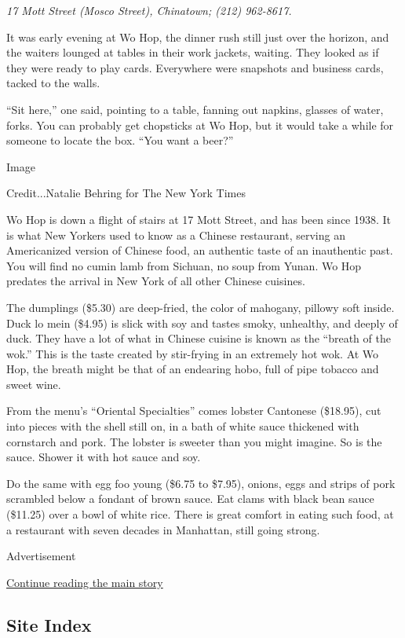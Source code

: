 \emph{17 Mott Street (Mosco Street), Chinatown; (212) 962-8617.}

It was early evening at Wo Hop, the dinner rush still just over the
horizon, and the waiters lounged at tables in their work jackets,
waiting. They looked as if they were ready to play cards. Everywhere
were snapshots and business cards, tacked to the walls.

``Sit here,'' one said, pointing to a table, fanning out napkins,
glasses of water, forks. You can probably get chopsticks at Wo Hop, but
it would take a while for someone to locate the box. ``You want a
beer?''

Image

Credit...Natalie Behring for The New York Times

Wo Hop is down a flight of stairs at 17 Mott Street, and has been since
1938. It is what New Yorkers used to know as a Chinese restaurant,
serving an Americanized version of Chinese food, an authentic taste of
an inauthentic past. You will find no cumin lamb from Sichuan, no soup
from Yunan. Wo Hop predates the arrival in New York of all other Chinese
cuisines.

The dumplings (\$5.30) are deep-fried, the color of mahogany, pillowy
soft inside. Duck lo mein (\$4.95) is slick with soy and tastes smoky,
unhealthy, and deeply of duck. They have a lot of what in Chinese
cuisine is known as the ``breath of the wok.'' This is the taste created
by stir-frying in an extremely hot wok. At Wo Hop, the breath might be
that of an endearing hobo, full of pipe tobacco and sweet wine.

From the menu's ``Oriental Specialties'' comes lobster Cantonese
(\$18.95), cut into pieces with the shell still on, in a bath of white
sauce thickened with cornstarch and pork. The lobster is sweeter than
you might imagine. So is the sauce. Shower it with hot sauce and soy.

Do the same with egg foo young (\$6.75 to \$7.95), onions, eggs and
strips of pork scrambled below a fondant of brown sauce. Eat clams with
black bean sauce (\$11.25) over a bowl of white rice. There is great
comfort in eating such food, at a restaurant with seven decades in
Manhattan, still going strong.

Advertisement

\protect\hyperlink{after-bottom}{Continue reading the main story}

\hypertarget{site-index}{%
\subsection{Site Index}\label{site-index}}

